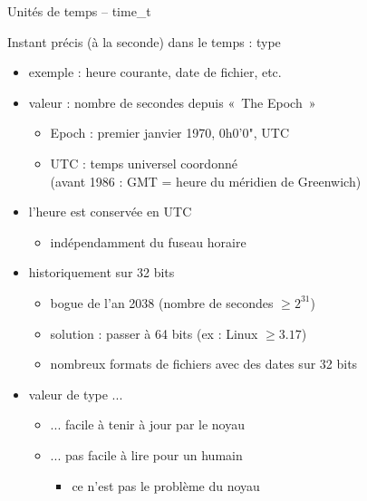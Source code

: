 \begin {frame} {Unités de temps -- time\_t}

    Instant précis (à la seconde) dans le temps : type 

    \begin {itemize}
	\item exemple : heure courante, date de fichier, etc.
	\item valeur : nombre de secondes depuis «~The Epoch~»
	    \begin {itemize}
		\item Epoch : premier janvier 1970, 0h0'0", UTC
		\item UTC : temps universel coordonné
		    \\
		    {\fC (avant 1986 : GMT = heure du méridien de
		    Greenwich)}

	    \end {itemize}

	\item l'heure est conservée en UTC
	    \begin {itemize}
		\item indépendamment du fuseau horaire
	    \end {itemize}

	\item {} historiquement sur 32 bits
	    \begin {itemize}
		\item bogue de l'an 2038 (nombre de secondes $\geq 2^{31}$)
		\item solution : passer à 64 bits (ex : Linux $\geq 3.17$)
		\item nombreux formats de fichiers avec des dates
		    sur 32 bits
	    \end {itemize}

	\item valeur de type ...
	    \begin {itemize}
		\item ... facile à tenir à jour par le noyau
		\item ... pas facile à lire pour un humain
		    \begin {itemize}
			\item ce n'est pas le problème du noyau
		    \end {itemize}
	    \end {itemize}
    \end {itemize}
\end {frame}

